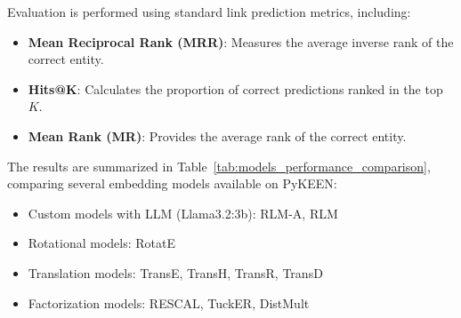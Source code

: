 Evaluation is performed using standard link prediction metrics, including:

\begin{itemize}
    \item \textbf{Mean Reciprocal Rank (MRR)}: Measures the average inverse rank of the correct entity. %
    \item \textbf{Hits@K}: Calculates the proportion of correct predictions ranked in the top $K$. %
    \item \textbf{Mean Rank (MR)}: Provides the average rank of the correct entity. %
\end{itemize}

The results are summarized in Table~\ref{tab:models_performance_comparison}, comparing several embedding models available on PyKEEN:
\begin{itemize}
    \item Custom models with LLM (Llama3.2:3b): RLM-A, RLM
    \item Rotational models: RotatE
    \item Translation models: TransE, TransH, TransR, TransD
    \item Factorization models: RESCAL, TuckER, DistMult
\end{itemize}




